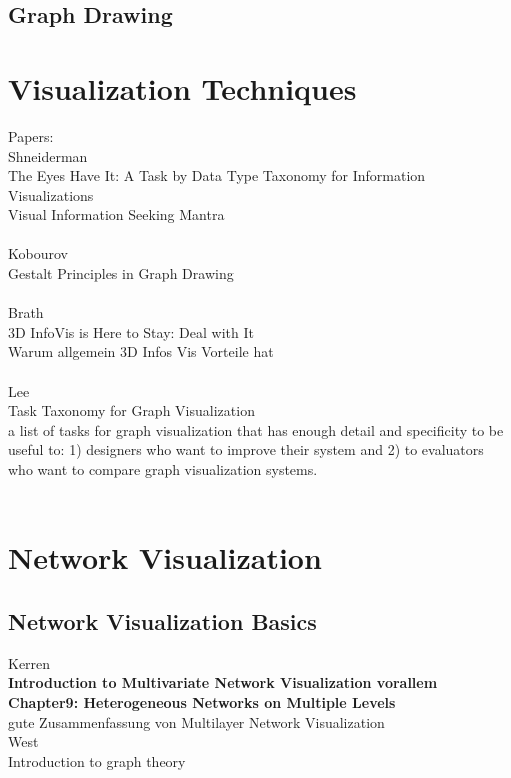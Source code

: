 \subsection{Graph Drawing}

\section{Visualization Techniques}
Papers:\\

Shneiderman\\
The Eyes Have It: A Task by Data Type Taxonomy for Information Visualizations\\
Visual Information Seeking Mantra\\
\\
Kobourov\\
Gestalt Principles in Graph Drawing\\
\\
Brath \\
3D InfoVis is Here to Stay: Deal with It\\
Warum allgemein 3D Infos Vis Vorteile hat\\
\\
Lee\\
Task Taxonomy for Graph Visualization\\
a list of tasks for graph visualization that has
enough detail and specificity to be useful to: 1) designers who
want to improve their system and 2) to evaluators who want to
compare graph visualization systems.\\
\\

\section{Network Visualization}

\subsection{Network Visualization Basics}

Kerren\\
\textbf{Introduction to Multivariate Network Visualization vorallem Chapter9: Heterogeneous Networks on Multiple Levels} \\
gute Zusammenfassung von Multilayer Network Visualization\\

West\\
Introduction to graph theory\\
\\

